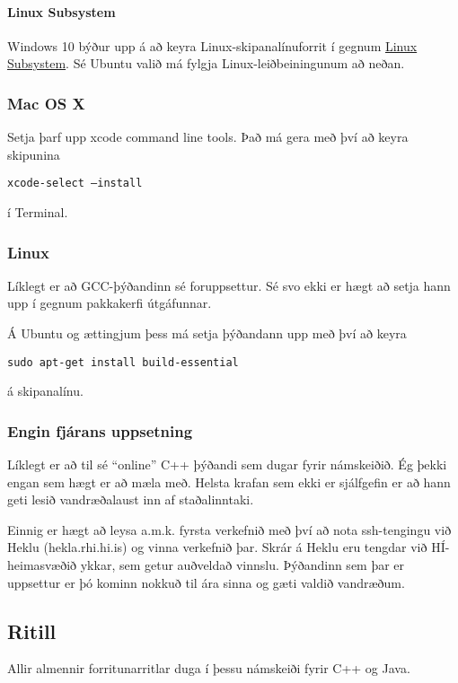 \documentclass{article}
\begin{document}
\paragraph{Linux Subsystem} Windows 10 býður upp á að keyra Linux-skipanalínuforrit í gegnum \href{https://docs.microsoft.com/en-us/windows/wsl/install-win10}{Linux Subsystem}. Sé Ubuntu valið má fylgja Linux-leiðbeiningunum að neðan.

\subsubsection{Mac OS X}

Setja þarf upp xcode command line tools. Það má gera með því að keyra skipunina 

\texttt{xcode-select --install}

í Terminal.

\subsubsection{Linux}

Líklegt er að GCC-þýðandinn sé foruppsettur. Sé svo ekki er hægt að setja hann upp í gegnum pakkakerfi útgáfunnar.

Á Ubuntu og ættingjum þess má setja þýðandann upp með því að keyra

\texttt{sudo apt-get install build-essential}

á skipanalínu.

\subsubsection{Engin fjárans uppsetning}

Líklegt er að til sé ``online'' C++ þýðandi sem dugar fyrir námskeiðið. Ég þekki engan sem hægt er að mæla með. Helsta krafan sem ekki er sjálfgefin er að hann geti lesið vandræðalaust inn af staðalinntaki.

Einnig er hægt að leysa a.m.k. fyrsta verkefnið með því að nota ssh-tengingu við Heklu (hekla.rhi.hi.is) og vinna verkefnið þar. Skrár á Heklu eru tengdar við HÍ-heimasvæðið ykkar, sem getur auðveldað vinnslu. Þýðandinn sem þar er uppsettur er þó kominn nokkuð til ára sinna og gæti valdið vandræðum.

\subsection{Ritill}

Allir almennir forritunarritlar duga í þessu námskeiði fyrir C++ og Java.
\end{document}
